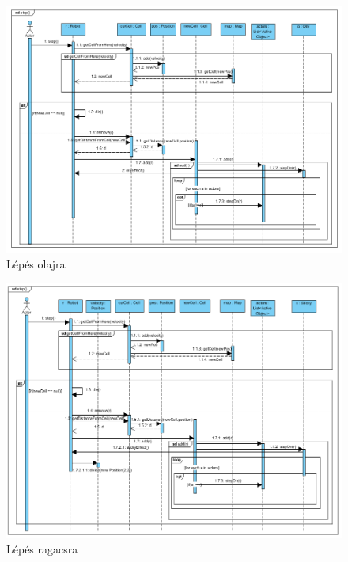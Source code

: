\begin{figure}[!htbp]
	\begin{center}
		\includegraphics[width=18cm]{./chapters/chapter05/stepoilysequence.png}
		\caption{Lépés olajra}
	\end{center}
\end{figure}

\clearpage

\begin{figure}[!htbp]
	\begin{center}
		\includegraphics[width=18cm]{./chapters/chapter05/stepstickysequence.png}
		\caption{Lépés ragacsra}
	\end{center}
\end{figure}

